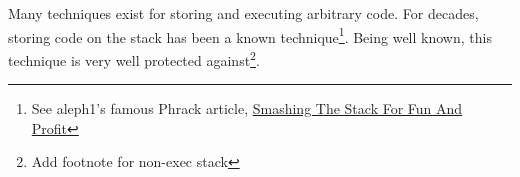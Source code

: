 Many techniques exist for storing and executing arbitrary code. For decades, storing
code on the stack has been a known technique\footnote{See aleph1's famous Phrack article,
\href{http://www.phrack.com/issues.html?issue=49&id=14&mode=txt}{Smashing The Stack For Fun And Profit}}.
Being well known, this technique is very well protected against\footnote{Add footnote for non-exec stack}.
